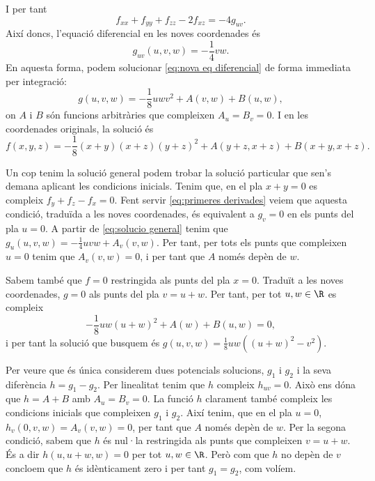 \documentclass[12pt, a4paper]{article}
\begin{document}
I per tant 
\begin{equation}
  f_{xx} + f_{yy} + f_{zz} - 2f_{xz} = -4g_{uv}. 
\end{equation}
Així doncs, l'equació diferencial en les noves coordenades és 
\begin{equation}
  g_{uv}(u,v,w) = -\dfrac{1}{4}vw. \label{eq:nova eq diferencial}
\end{equation}
En aquesta forma, podem solucionar \ref{eq:nova eq diferencial} de forma immediata per integració:
\begin{equation}
  g(u,v,w) = -\dfrac{1}{8}uwv^2 + A(v,w) + B(u,w), \label{eq:solucio general}
\end{equation}
on \( A \) i \( B \) són funcions arbitràries que compleixen \( A_u = B_v = 0 \). I en les coordenades originals, la solució és
\begin{equation}
  f(x,y,z) = -\dfrac{1}{8}(x+y)(x+z)(y+z)^2 + A(y+z,x+z) + B(x+y,x+z).
\end{equation}

Un cop tenim la solució general podem trobar la solució particular que sen's demana aplicant les condicions inicials. Tenim que, en el pla \( x+y = 0 \) es compleix \( f_y + f_z - f_x = 0 \). Fent servir \ref{eq:primeres derivades} veiem que aquesta condició, traduïda a les noves coordenades, és equivalent a \( g_v = 0 \) en els punts del pla \( u = 0 \). A partir de \ref{eq:solucio general} tenim que \( g_u(u,v,w) = -\frac{1}{4}uvw + A_v(v,w) \). Per tant, per tots els punts que compleixen \( u = 0 \) tenim que \( A_v(v,w) = 0 \), i per tant que \( A \) només depèn de \( w \).

Sabem també que \( f = 0 \) restringida als punts del pla \( x = 0 \). Traduït a les noves coordenades, \( g = 0 \) als punts del pla \( v = u + w \). Per tant, per tot \( u,w \in \R \) es compleix
\begin{equation*}
  -\dfrac{1}{8}uw(u+w)^2 + A(w) + B(u,w) = 0,
\end{equation*}
i per tant la solució que busquem és \( g(u,v,w) = \frac{1}{8}uw\left((u+w)^2 - v^2\right) \).

Per veure que és única considerem dues potencials solucions, \( g_1 \) i \( g_2 \) i la seva diferència \( h = g_1 -g_2 \). Per linealitat tenim que \( h \) compleix \( h_{uv} = 0 \). Això ens dóna que \( h = A + B	\) amb \( A_u = B_v = 0 \). La funció \( h \) clarament també compleix les condicions inicials que compleixen \( g_1 \) i \( g_2 \). Així tenim, que en el pla \( u = 0 \), \( h_v(0,v,w) = A_v(v,w) = 0 \), per tant que \( A \) només depèn de \( w \). Per la segona condició, sabem que \( h \) és nul·la restringida als punts que compleixen \( v = u + w \). És a dir \( h(u,u+w,w) = 0 \) per tot \( u,w \in \R \). Però com que \( h \) no depèn de \( v \) concloem que \( h \) és idènticament zero i per tant \( g_1 = g_2 \), com volíem.
\end{document}
